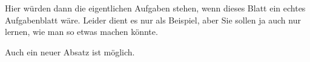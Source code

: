
\begin{Blatt}
Hier würden dann die eigentlichen Aufgaben stehen, wenn dieses Blatt ein echtes Aufgabenblatt wäre. Leider dient es nur als Beispiel, aber Sie sollen ja auch nur lernen, wie man so etwas machen könnte.

Auch ein neuer Absatz ist möglich.
\end{Blatt}

